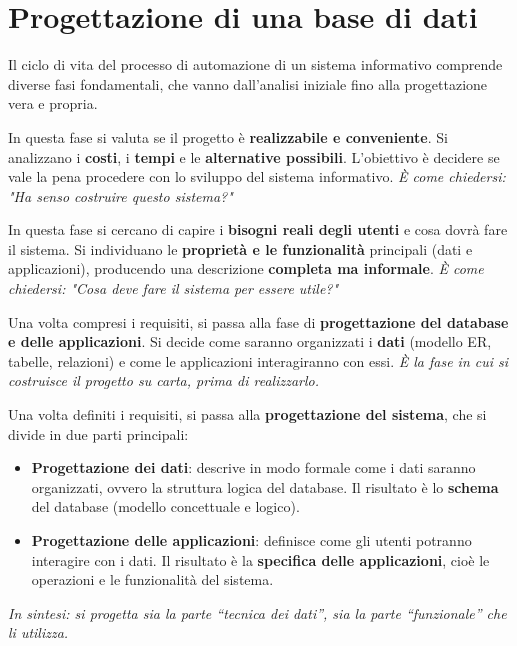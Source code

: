 \section{Progettazione di una base di dati}
Il ciclo di vita del processo di automazione di un sistema informativo comprende diverse fasi fondamentali, che vanno dall'analisi iniziale fino alla progettazione vera e propria.

\begin{tcolorbox}[colback=red!10!white, colframe=red!70!black, title=\textbf{1. Studio di fattibilità}]
In questa fase si valuta se il progetto è \textbf{realizzabile e conveniente}.  
Si analizzano i \textbf{costi}, i \textbf{tempi} e le \textbf{alternative possibili}.  
L’obiettivo è decidere se vale la pena procedere con lo sviluppo del sistema informativo.  
\textit{È come chiedersi: "Ha senso costruire questo sistema?"}
\end{tcolorbox}

\begin{tcolorbox}[colback=orange!10!white, colframe=orange!70!black, title=\textbf{2. Raccolta e analisi dei requisiti}]
In questa fase si cercano di capire i \textbf{bisogni reali degli utenti} e cosa dovrà fare il sistema.  
Si individuano le \textbf{proprietà e le funzionalità} principali (dati e applicazioni), producendo una descrizione \textbf{completa ma informale}.  
\textit{È come chiedersi: "Cosa deve fare il sistema per essere utile?"}
\end{tcolorbox}

\begin{tcolorbox}[colback=yellow!10!white, colframe=yellow!70!black, title=\textbf{3. Progettazione}]
Una volta compresi i requisiti, si passa alla fase di \textbf{progettazione del database e delle applicazioni}.  
Si decide come saranno organizzati i \textbf{dati} (modello ER, tabelle, relazioni) e come le applicazioni interagiranno con essi.  
\textit{È la fase in cui si costruisce il progetto su carta, prima di realizzarlo.}
\end{tcolorbox}
\begin{tcolorbox}[colback=green!10!white, colframe=green!70!black, title=\textbf{4. Progettazione del sistema}]
Una volta definiti i requisiti, si passa alla \textbf{progettazione del sistema}, che si divide in due parti principali:
\begin{itemize}
    \item \textbf{Progettazione dei dati}: descrive in modo formale come i dati saranno organizzati, ovvero la struttura logica del database.  
    Il risultato è lo \textbf{schema} del database (modello concettuale e logico).
    \item \textbf{Progettazione delle applicazioni}: definisce come gli utenti potranno interagire con i dati.  
    Il risultato è la \textbf{specifica delle applicazioni}, cioè le operazioni e le funzionalità del sistema.
\end{itemize}
\textit{In sintesi: si progetta sia la parte “tecnica dei dati”, sia la parte “funzionale” che li utilizza.}
\end{tcolorbox}

